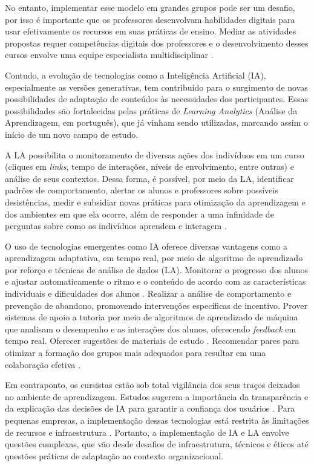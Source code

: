 \documentclass[portuguese]{textolivre}
\begin{document}
No entanto, implementar esse modelo em grandes grupos pode ser um desafio, por isso é importante que os professores desenvolvam habilidades digitais para usar efetivamente os recursos em suas práticas de ensino. Mediar as atividades propostas requer competências digitais dos professores e o desenvolvimento desses cursos envolve uma equipe especialista multidisciplinar \cite{becerra_diseno_2020}.

Contudo, a evolução de tecnologias como a Inteligência Artificial (IA), especialmente as versões generativas, tem contribuído para o surgimento de novas possibilidades de adaptação de conteúdos às necessidades dos participantes. Essas possibilidades são fortalecidas pelas práticas de \textit{Learning Analytics} (Análise da Aprendizagem, em português), que já vinham sendo utilizadas, marcando assim o início de um novo campo de estudo. 

A LA possibilita o monitoramento de diversas ações dos indivíduos em um curso (cliques em \textit{links}, tempo de interações, níveis de envolvimento, entre outras) e análise de seus contextos. Dessa forma, é possível, por meio da LA, identificar padrões de comportamento, alertar os alunos e professores sobre possíveis desistências, medir e subsidiar novas práticas para otimização da aprendizagem e dos ambientes em que ela ocorre, além de responder a uma infinidade de perguntas sobre como os indivíduos aprendem e interagem \cite{siemens_learning_2013}.

O uso de tecnologias emergentes como IA oferece diversas vantagens como a aprendizagem adaptativa, em tempo real, por meio de algoritmo de aprendizado por reforço e técnicas de análise de dados (LA). Monitorar o progresso dos alunos e ajustar automaticamente o ritmo e o conteúdo de acordo com as características individuais e dificuldades dos alunos \cite{altaleb_enhancing_2023}. Realizar a análise de comportamento e prevenção de abandono, promovendo intervenções específicas de incentivo. Prover sistemas de apoio a tutoria por meio de algoritmos de aprendizado de máquina que analisam o desempenho e as interações dos alunos, oferecendo \textit{feedback} em tempo real. Oferecer sugestões de materiais de estudo \cite{becerra_diseno_2020}. Recomendar pares para otimizar a formação dos grupos mais adequados para resultar em uma colaboração efetiva \cite{ma_effects_2023}.

Em contraponto, os cursistas estão sob total vigilância dos seus traços deixados no ambiente de aprendizagem. Estudos sugerem a importância da transparência e da explicação das decisões de IA para garantir a confiança dos usuários \cite{swamy_trusting_2023}. Para pequenas empresas, a implementação dessas tecnologias está restrita às limitações de recursos e infraestrutura \cite{bhatt_artificial_2023}. Portanto, a implementação de IA e LA envolve questões complexas, que vão desde desafios de infraestrutura, técnicos e éticos até questões práticas de adaptação ao contexto organizacional.
\end{document}
